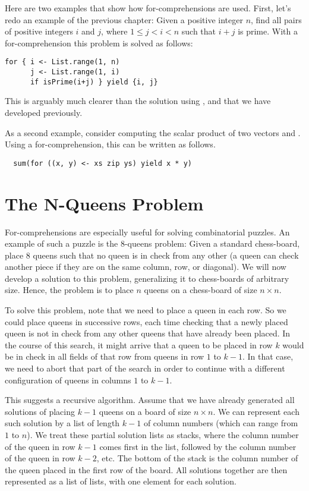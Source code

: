 Here are two examples that show how for-comprehensions are used.
First, let's redo an example of the previous chapter: Given a positive
integer $n$, find all pairs of positive integers $i$ and $j$, where $1
\leq j < i < n$ such that $i + j$ is prime. With a for-comprehension
this problem is solved as follows:
\begin{lstlisting}
for { i <- List.range(1, n)
      j <- List.range(1, i)
      if isPrime(i+j) } yield {i, j}
\end{lstlisting}
This is arguably much clearer than the solution using ,
 and  that we have developed previously.

As a second example, consider computing the scalar product of two
vectors  and . Using a for-comprehension, this can
be written as follows.
\begin{lstlisting}
  sum(for ((x, y) <- xs zip ys) yield x * y)
\end{lstlisting}

\section{The N-Queens Problem}

For-comprehensions are especially useful for solving combinatorial
puzzles. An example of such a puzzle is the 8-queens problem: Given a
standard chess-board, place 8 queens such that no queen is in check from any
other (a queen can check another piece if they are on the same
column, row, or diagonal). We will now develop a solution to this
problem, generalizing it to chess-boards of arbitrary size. Hence, the
problem is to place $n$ queens on a chess-board of size $n \times n$.

To solve this problem, note that we need to place a queen in each row.
So we could place queens in successive rows, each time checking that a
newly placed queen is not in check from any other queens that have
already been placed. In the course of this search, it might arrive
that a queen to be placed in row $k$ would be in check in all fields
of that row from queens in row $1$ to $k-1$. In that case, we need to
abort that part of the search in order to continue with a different
configuration of queens in columns $1$ to $k-1$.

This suggests a recursive algorithm.  Assume that we have already
generated all solutions of placing $k-1$ queens on a board of size $n
\times n$. We can represent each such solution by a list of length
$k-1$ of column numbers (which can range from $1$ to $n$).  We treat
these partial solution lists as stacks, where the column number of the
queen in row $k-1$ comes first in the list, followed by the column
number of the queen in row $k-2$, etc. The bottom of the stack is the
column number of the queen placed in the first row of the board.  All
solutions together are then represented as a list of lists, with one
element for each solution.

